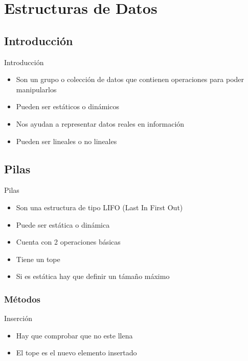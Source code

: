 \documentclass{beamer}
\begin{document}
\section{Estructuras de Datos}

\subsection{Introducci\'on}
\begin{frame}{Introducci\'on}
	\begin{itemize}
		\item Son un grupo o colecci\'on de datos que contienen operaciones para poder manipularlos
		\item Pueden ser est\'aticos o din\'amicos
		\item Nos ayudan a representar datos reales en informaci\'on
		\item Pueden ser lineales o no lineales
	\end{itemize}
\end{frame}

\subsection{Pilas}
\begin{frame}{Pilas}
	\begin{itemize}
		\item Son una estructura de tipo LIFO (Last In First Out)
		\item Puede ser est\'atica o din\'amica
		\item Cuenta con 2 operaciones b\'asicas
		\item Tiene un tope
		\item Si es est\'atica hay que definir un t\'amaño m\'aximo
	\end{itemize}
\end{frame}

\subsubsection{M\'etodos}

\begin{frame}{Inserci\'on}
	\begin{itemize}
		\item Hay que comprobar que no este llena
		\item El tope es el nuevo elemento insertado
	\end{itemize}
	\centering
\end{frame}
\end{document}
